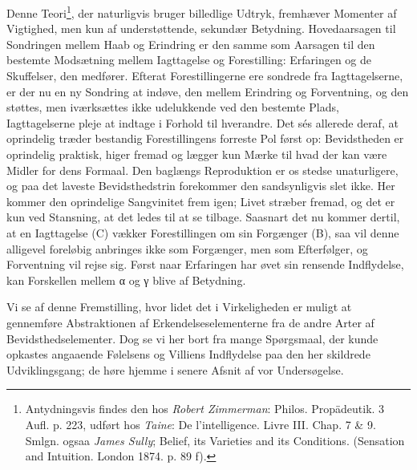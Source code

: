 \documentclass[12pt,a4paper,openany]{book}
\newcommand{\opage}[1]{\marginnote{\footnotesize\textit{[#1]}}}
\begin{document}
Denne Teori\footnote[1]{Antydningsvis findes den hos \emph{Robert
Zimmerman}: Philos. Propädeutik. 3 Aufl. p. 223, udført hos
\emph{Taine}: De l’intelligence. Livre III. Chap. 7 \& 9. Smlgn. ogsaa
\emph{James Sully}; Belief, its Varieties and its Conditions. (Sensation
and Intuition. London 1874. p. 89 f).}, der naturligvis bruger
billedlige Udtryk, fremhæver Momenter af Vigtighed, men kun af
understøttende, sekundær Betydning. Hovedaarsagen til Sondringen mellem
Haab og Erindring er den samme som Aarsagen til den bestemte Modsætning
mellem Iagttagelse og Forestilling: Erfaringen og de Skuffelser, den
medfører. Efterat Forestillingerne ere sondrede fra Iagttagelserne, er
der nu en ny Sondring at indøve, den mellem Erindring og Forventning, og
den støttes, men iværksættes ikke udelukkende ved den bestemte Plads,
Iagttagelserne pleje at indtage i Forhold til hverandre. Det sés
allerede deraf, at oprindelig træder bestandig Forestillingens
\opage{164}forreste Pol først op: Bevidstheden er oprindelig praktisk,
higer fremad og lægger kun Mærke til hvad der kan være Midler for dens
Formaal. Den baglængs Reproduktion er os stedse unaturligere, og paa det
laveste Bevidsthedstrin forekommer den sandsynligvis slet ikke. Her
kommer den oprindelige Sangvinitet frem igen; Livet stræber fremad, og
det er kun ved Stansning, at det ledes til at se tilbage. Saasnart det
nu kommer dertil, at en Iagttagelse (C) vækker Forestillingen om sin
Forgænger (B), saa vil denne alligevel foreløbig anbringes ikke som
Forgænger, men som Efterfølger, og Forventning vil rejse sig. Først naar
Erfaringen har øvet sin rensende Indflydelse, kan Forskellen mellem α og
γ blive af Betydning.

Vi se af denne Fremstilling, hvor lidet det i Virkeligheden er muligt at
gennemføre Abstraktionen af Erkendelseselementerne fra de andre Arter af
Bevidsthedselementer. Dog se vi her bort fra mange Spørgsmaal, der kunde
opkastes angaaende Følelsens og Villiens Indflydelse paa den her
skildrede Udviklingsgang; de høre hjemme i senere Afsnit af vor
Undersøgelse.
\end{document}
